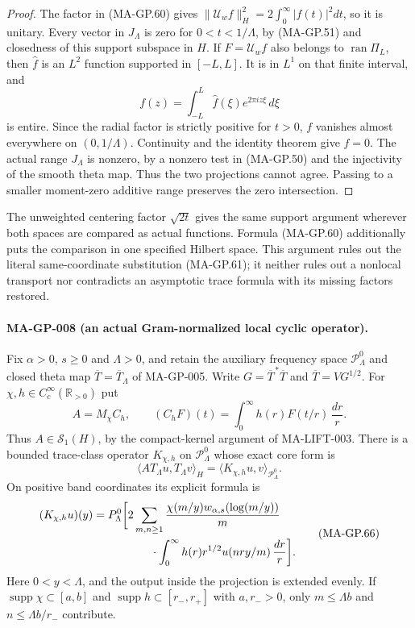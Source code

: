 \begin{proof}
The factor in (MA-GP.60) gives
$\|\mathcal U_w f\|_H^2=2\int_0^\infty|f(t)|^2dt$,
so it is unitary.  Every vector in $J_\Lambda$ is zero for
$0<t<1/\Lambda$, by (MA-GP.51) and closedness of this
support subspace in $H$.
If $F=\mathcal U_w f$ also belongs to $\operatorname{ran}\Pi_L$,
then $\widehat f$ is an $L^2$ function supported in $[-L,L]$.
It is in $L^1$ on that finite interval, and
\[
                 f(z)=\int_{-L}^{L}\widehat f(\xi)
                                         e^{2\pi iz\xi}\,d\xi
 \tag{MA-GP.63}
\]
is entire.  Since the radial factor is strictly positive for
$t>0$, $f$ vanishes almost everywhere on $(0,1/\Lambda)$.
Continuity and the identity theorem give $f=0$.
The actual range $J_\Lambda$ is nonzero, by a nonzero test
in (MA-GP.50) and the injectivity of the smooth theta map.
Thus the two projections cannot agree.  Passing to a smaller
moment-zero additive range preserves the zero intersection.
\end{proof}

The unweighted centering factor $\sqrt{2t}$ gives the same
support argument wherever both spaces are compared as actual
functions.  Formula (MA-GP.60) additionally puts the comparison
in one specified Hilbert space.  This argument rules out the
literal same-coordinate substitution (MA-GP.61); it neither
rules out a nonlocal transport nor contradicts an asymptotic
trace formula with its missing factors restored.

\paragraph{MA-GP-008 (an actual Gram-normalized local cyclic operator).}
Fix $\alpha>0$, $s\ge0$ and $\Lambda>0$, and retain the
auxiliary frequency space $\mathcal P_\Lambda^0$ and closed
theta map $\overline T=\overline T_\Lambda$ of MA-GP-005.
Write $G=\overline T^{\,*}\overline T$ and
$\overline T=VG^{1/2}$.
For $\chi,h\in C_c^\infty(\mathbb R_{>0})$ put
\[
 A=M_\chi C_h,\qquad
 (C_hF)(t)=\int_0^\infty h(r)F(t/r)\,\frac{dr}{r}.
 \tag{MA-GP.64}
\]
Thus $A\in\mathcal S_1(H)$, by the compact-kernel argument
of MA-LIFT-003.  There is a bounded trace-class operator
$K_{\chi,h}$ on $\mathcal P_\Lambda^0$ whose exact core form is
\[
       \langle A T_\Lambda u,T_\Lambda v\rangle_H
                         =\langle K_{\chi,h}u,v\rangle_{\mathcal P_\Lambda^0}.
 \tag{MA-GP.65}
\]
On positive band coordinates its explicit formula is
\[
 \begin{split}
 (K_{\chi,h}u)(y)&=P_\Lambda^0\biggl[
 2\sum_{m,n\ge1}\frac{\chi(m/y)w_{\alpha,s}(\log(m/y))}{m}\\
 &\hspace{18mm}\cdot\int_0^\infty h(r)r^{1/2}u(nry/m)\,\frac{dr}{r}
                                      \biggr].
 \end{split}
 \tag{MA-GP.66}
\]
Here $0<y<\Lambda$, and the output inside the projection is extended evenly.
If $\operatorname{supp}\chi\subset[a,b]$ and
$\operatorname{supp}h\subset[r_-,r_+]$ with $a,r_->0$,
only $m\le\Lambda b$ and $n\le\Lambda b/r_-$ contribute.

